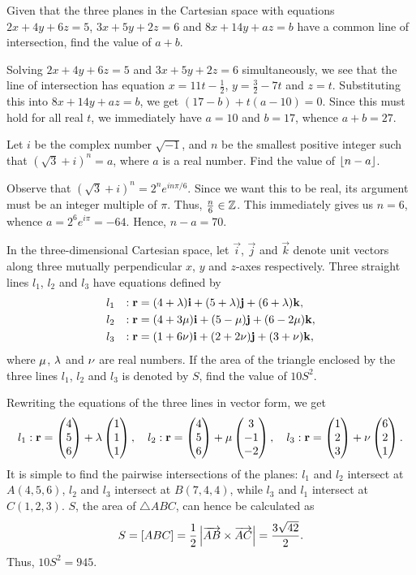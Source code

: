 \clearpage
\begin{question}[27]\label{A::2020-O-1-4}
    Given that the three planes in the Cartesian space with equations $2x + 4y + 6z = 5$, $3x + 5y + 2z = 6$ and $8x + 14y + az = b$ have a common line of intersection, find the value of $a + b$.
\end{question}
\begin{solution*}
    Solving $2x + 4y + 6z = 5$ and $3x + 5y + 2z = 6$ simultaneously, we see that the line of intersection has equation $x = 11t - \frac12$, $y = \frac32 - 7t$ and $z = t$. Substituting this into $8x + 14y + az = b$, we get $(17-b) + t(a-10) = 0$. Since this must hold for all real $t$, we immediately have $a = 10$ and $b = 17$, whence $a + b = 27$.
\end{solution*}

\begin{question}[70]\label{A::2020-O-1-5}
    Let $i$ be the complex number $\sqrt{-1}$, and $n$ be the smallest positive integer such that $(\sqrt3 + i)^n = a$, where $a$ is a real number. Find the value of $\left\lfloor n-a \right\rfloor$.
\end{question}
\begin{solution*}
    Observe that $(\sqrt3 + i)^n = 2^n e^{in\pi/6}$. Since we want this to be real, its argument must be an integer multiple of $\pi$. Thus, $\frac{n}{6} \in \mathbb{Z}$. This immediately gives us $n = 6$, whence $a = 2^6 e^{i\pi} = -64$. Hence, $n - a = 70$.
\end{solution*}

\begin{question}[945]\label{A::2020-O-1-6}
    In the three-dimensional Cartesian space, let $\vec i$, $\vec j$ and $\vec k$ denote unit vectors along three mutually perpendicular $x$, $y$ and $z$-axes respectively. Three straight lines $l_1$, $l_2$ and $l_3$ have equations defined by
    \begin{alignat*}{2}
    l_1 && : \mathbf{r} &= (4 + \lambda)\mathbf{i} + (5 + \lambda)\mathbf{j} + (6 + \lambda)\mathbf{k},\\
    l_2 && : \mathbf{r} &= (4 + 3\mu)\mathbf{i} + (5 - \mu)\mathbf{j} + (6 - 2\mu) \mathbf{k},\\
    l_3 && : \mathbf{r} &= (1 + 6\nu)\mathbf{i} + (2 + 2\nu) \mathbf{j} + (3 + \nu) \mathbf{k},
    \end{alignat*}
    where $\mu$, $\lambda$ and $\nu$ are real numbers. If the area of the triangle enclosed by the three lines $l_1$, $l_2$ and $l_3$ is denoted by $S$, find the value of $10S^2$.
\end{question}
\begin{solution*}
    Rewriting the equations of the three lines in vector form, we get \[l_1 : \mathbf{r} = \begin{pmatrix} 4 \\ 5 \\ 6 \end{pmatrix} + \lambda \begin{pmatrix} 1 \\ 1 \\ 1 \end{pmatrix}, \quad l_2 : \mathbf{r} = \begin{pmatrix} 4 \\ 5 \\ 6 \end{pmatrix} + \mu \begin{pmatrix} 3 \\ -1 \\ -2 \end{pmatrix}, \quad l_3 : \mathbf{r} = \begin{pmatrix} 1 \\ 2 \\ 3 \end{pmatrix} + \nu \begin{pmatrix} 6 \\ 2 \\ 1 \end{pmatrix}.\] It is simple to find the pairwise intersections of the planes: $l_1$ and $l_2$ intersect at $A(4, 5, 6)$, $l_2$ and $l_3$ intersect at $B(7, 4, 4)$, while $l_3$ and $l_1$ intersect at $C(1, 2, 3)$. $S$, the area of $\triangle ABC$, can hence be calculated as \[S = [ABC] = \frac12 \left\lvert \overrightarrow{AB} \times \overrightarrow{AC} \right\rvert = \frac{3\sqrt{42}}{2}.\] Thus, $10S^2 = 945$.
\end{solution*}

